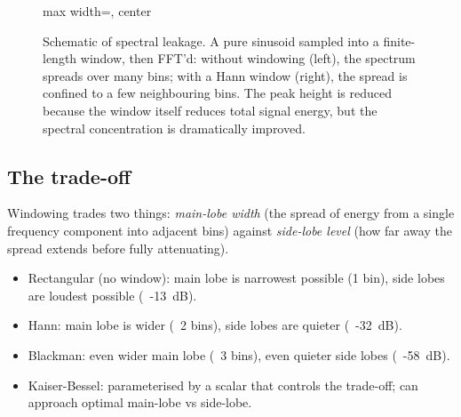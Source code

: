 \begin{figure}[t]
\centering
\begin{adjustbox}{max width=\textwidth, center}
\end{adjustbox}
\caption[Spectral leakage with and without windowing.]{Schematic
of spectral leakage. A pure sinusoid sampled into a finite-
length window, then FFT'd: without windowing (left), the
spectrum spreads over many bins; with a Hann window (right), the
spread is confined to a few neighbouring bins. The peak height
is reduced because the window itself reduces total signal
energy, but the spectral concentration is dramatically improved.}
\label{fig:signal_windows:leakage}
\end{figure}

\subsection{The trade-off}
\label{ssec:signal_windows:trade_off}

Windowing trades two things: \emph{main-lobe width} (the spread
of energy from a single frequency component into adjacent bins)
against \emph{side-lobe level} (how far away the spread extends
before fully attenuating).

\begin{itemize}
  \item Rectangular (no window): main lobe is narrowest possible
    (1 bin), side lobes are loudest possible (~-13~dB).
  \item Hann: main lobe is wider (~2 bins), side lobes are
    quieter (~-32~dB).
  \item Blackman: even wider main lobe (~3 bins), even quieter
    side lobes (~-58~dB).
  \item Kaiser-Bessel: parameterised by a scalar that controls
    the trade-off; can approach optimal main-lobe vs side-lobe.
\end{itemize}

